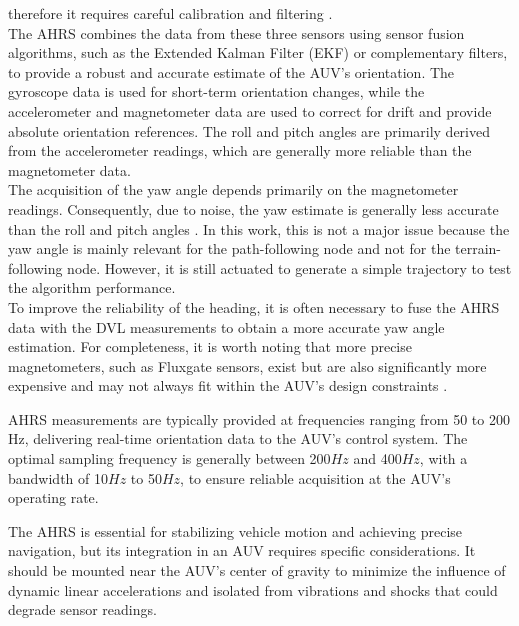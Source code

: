 therefore it requires careful calibration and filtering \cite{koSineRotationVector2016}.\\
The AHRS combines the data from these three sensors using sensor fusion algorithms, such as the Extended Kalman Filter (EKF) or complementary filters, to provide a robust and
accurate estimate of the AUV's orientation. The gyroscope data is used for short-term orientation changes, while the accelerometer and magnetometer data are used to correct 
for drift and provide absolute orientation references. The roll and pitch angles are primarily derived from the accelerometer readings, which are generally more 
reliable than the magnetometer data.\\
The acquisition of the yaw angle depends primarily on the magnetometer readings. Consequently, due to noise, the yaw estimate is generally less accurate than 
the roll and pitch angles \cite{koComparisonAttitudeEstimation2016}. In this work, this is not a major issue because the yaw angle is mainly relevant for the 
path-following node and not for the terrain-following node. However, it is still actuated to generate a simple trajectory to test the algorithm performance.\\ 
To improve the reliability of the heading, it is often necessary to fuse the AHRS data with the DVL measurements to obtain a more accurate yaw angle estimation.  
For completeness, it is worth noting that more precise magnetometers, such as Fluxgate sensors, exist but are also significantly more expensive and may not always 
fit within the AUV's design constraints \cite{timmermannComparisonNoiseLevels2025}.

AHRS measurements are typically provided at frequencies ranging from 50 to 200 Hz, delivering real-time orientation data to the AUV's control system. The optimal sampling 
frequency is generally between 200$Hz$ and 400$Hz$, with a bandwidth of 10$Hz$ to 50$Hz$, to ensure reliable acquisition at the AUV's operating rate.

The AHRS is essential for stabilizing vehicle motion and achieving precise navigation, but its integration in an AUV requires specific considerations.  
It should be mounted near the AUV's center of gravity to minimize the influence of dynamic linear accelerations and isolated from vibrations and shocks that 
could degrade sensor readings.

